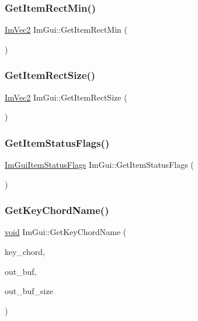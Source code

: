\subsubsection{\texorpdfstring{Get\+Item\+Rect\+Min()}{GetItemRectMin()}}
{\footnotesize\ttfamily \hyperlink{structImVec2}{Im\+Vec2} Im\+Gui\+::\+Get\+Item\+Rect\+Min (\begin{DoxyParamCaption}{ }\end{DoxyParamCaption})}

\mbox{\label{namespaceImGui_a3303d1c37041307e11fd46fc43b2274d}} 
\subsubsection{\texorpdfstring{Get\+Item\+Rect\+Size()}{GetItemRectSize()}}
{\footnotesize\ttfamily \hyperlink{structImVec2}{Im\+Vec2} Im\+Gui\+::\+Get\+Item\+Rect\+Size (\begin{DoxyParamCaption}{ }\end{DoxyParamCaption})}

\mbox{\label{namespaceImGui_a8e43b6bdd1da0ef409a6fc192f448172}} 
\subsubsection{\texorpdfstring{Get\+Item\+Status\+Flags()}{GetItemStatusFlags()}}
{\footnotesize\ttfamily \hyperlink{imgui__internal_8h_a86b8f9e2fd4084fb2112f003070b53fa}{Im\+Gui\+Item\+Status\+Flags} Im\+Gui\+::\+Get\+Item\+Status\+Flags (\begin{DoxyParamCaption}{ }\end{DoxyParamCaption})\hspace{0.3cm}{\ttfamily [inline]}}

\mbox{\label{namespaceImGui_a2a3cfbe383c91457ed73a3dda0550e62}} 
\subsubsection{\texorpdfstring{Get\+Key\+Chord\+Name()}{GetKeyChordName()}}
{\footnotesize\ttfamily \hyperlink{imgui__impl__opengl3__loader_8h_ac668e7cffd9e2e9cfee428b9b2f34fa7}{void} Im\+Gui\+::\+Get\+Key\+Chord\+Name (\begin{DoxyParamCaption}\item[{Im\+Gui\+Key\+Chord}]{key\+\_\+chord,  }\item[{char $\ast$}]{out\+\_\+buf,  }\item[{int}]{out\+\_\+buf\+\_\+size }\end{DoxyParamCaption})}


